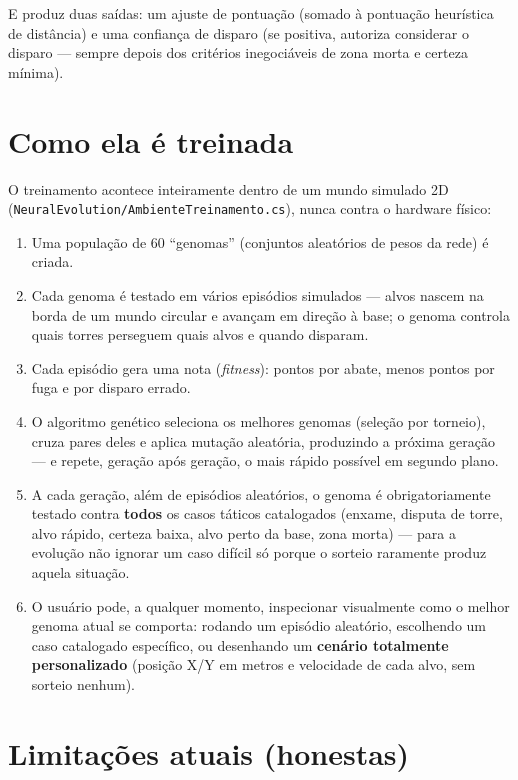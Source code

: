 \documentclass[11pt,a4paper]{article}
\begin{document}
E produz duas saídas: um ajuste de pontuação (somado à pontuação heurística de distância) e uma
confiança de disparo (se positiva, autoriza considerar o disparo — sempre depois dos critérios
inegociáveis de zona morta e certeza mínima).

\section{Como ela é treinada}

O treinamento acontece inteiramente dentro de um mundo simulado 2D
(\texttt{NeuralEvolution/AmbienteTreinamento.cs}), nunca contra o hardware físico:

\begin{enumerate}[leftmargin=1.4em]
  \item Uma população de 60 ``genomas'' (conjuntos aleatórios de pesos da rede) é criada.
  \item Cada genoma é testado em vários episódios simulados — alvos nascem na borda de um mundo
    circular e avançam em direção à base; o genoma controla quais torres perseguem quais alvos e
    quando disparam.
  \item Cada episódio gera uma nota (\emph{fitness}): pontos por abate, menos pontos por fuga e
    por disparo errado.
  \item O algoritmo genético seleciona os melhores genomas (seleção por torneio), cruza pares
    deles e aplica mutação aleatória, produzindo a próxima geração — e repete, geração após
    geração, o mais rápido possível em segundo plano.
  \item A cada geração, além de episódios aleatórios, o genoma é obrigatoriamente testado contra
    \textbf{todos} os casos táticos catalogados (enxame, disputa de torre, alvo rápido, certeza
    baixa, alvo perto da base, zona morta) — para a evolução não ignorar um caso difícil só
    porque o sorteio raramente produz aquela situação.
  \item O usuário pode, a qualquer momento, inspecionar visualmente como o melhor genoma atual se
    comporta: rodando um episódio aleatório, escolhendo um caso catalogado específico, ou
    desenhando um \textbf{cenário totalmente personalizado} (posição X/Y em metros e velocidade
    de cada alvo, sem sorteio nenhum).
\end{enumerate}

\section{Limitações atuais (honestas)}
\end{document}
